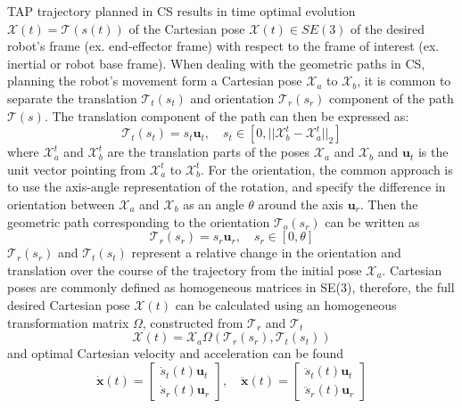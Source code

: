 TAP trajectory planned in CS results in time optimal evolution $\mathcal{X}(t)= \mathcal{T}\left(s(t)\right)$ of the Cartesian pose $\mathcal{X}(t)\in SE(3)$ of the desired robot's frame (ex. end-effector frame) with respect to the frame of interest (ex. inertial or robot base frame). When dealing with the geometric paths in CS, planning the robot's movement form a Cartesian pose $\mathcal{X}_a$ to $\mathcal{X}_b$, it is common to separate the translation $\mathcal{T}_t(s_t)$ and orientation $\mathcal{T}_r(s_r)$ component of the path $\mathcal{T}(s)$\cite{Bobrow1985}. The translation component of the path can then be expressed as:
\begin{equation}
    \mathcal{T}_t(s_t) = s_t \bm{u}_t, \quad s_t \in \left[0, ||\mathcal{X}_{b}^t - \mathcal{X}_{a}^t||_2\right]
\end{equation}
where $\mathcal{X}_{a}^t$ and $\mathcal{X}_{b}^t$ are the translation parts of the poses $\mathcal{X}_a$ and $\mathcal{X}_b$ and $\bm{u}_t$ is the unit vector pointing from $\mathcal{X}_{a}^t$ to $\mathcal{X}_{b}^t$. For the orientation, the common approach is to use the axis-angle representation of the rotation, and specify the difference in orientation between $\mathcal{X}_a$ and $\mathcal{X}_b$ as an angle $\theta$ around the axis $\bm{u}_{r}$. Then the geometric path corresponding to the orientation $\mathcal{T}_o(s_r)$ can be written as
\begin{equation}
    \mathcal{T}_r(s_r) = s_r \bm{u}_{r}, \quad s_r \in \left[0, \theta\right] 
\end{equation}
$\mathcal{T}_r(s_r)$ and $\mathcal{T}_t(s_t)$ represent a relative change in the orientation and translation over the course of the trajectory from the initial pose $\mathcal{X}_a$. Cartesian poses are commonly defined as homogeneous matrices in SE(3), therefore, the full desired Cartesian pose $\mathcal{X}(t)$ can be calculated using an homogeneous  transformation matrix $\Omega$, constructed from $\mathcal{T}_r$ and $\mathcal{T}_t$ 
\begin{equation}
    \mathcal{X}(t) = \mathcal{X}_a \Omega\left(\mathcal{T}_r(s_r), \mathcal{T}_t(s_t)\right)
\end{equation}
and optimal Cartesian velocity and acceleration can be found
\begin{equation}
    \dot{\bm{x}}(t)= \begin{bmatrix}\dot{s}_t(t) \bm{u}_t \\ \dot{s}_r( t) \bm{u}_r\end{bmatrix}, \quad 
    \ddot{\bm{x}}(t)= \begin{bmatrix}\ddot{s}_t(t) \bm{u}_t \\ \ddot{s}_r(t) \bm{u}_r\end{bmatrix}
\end{equation}
